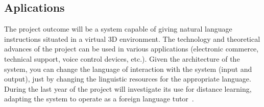 \subsection{Aplications}


The project outcome will be a system capable of giving natural language
instructions situated in a virtual 3D environment. The technology and
theoretical advances of the project can be used in various applications
(electronic commerce, technical support, voice control devices, etc.). 
Given the architecture of the system, you can change the language of interaction
with the system (input and output), just by changing the linguistic resources
for the appropriate language. During
the last year of the project will investigate its use for distance learning,
adapting the system to operate as a foreign language
tutor~\cite{Eskenazi09,Wik09}.




